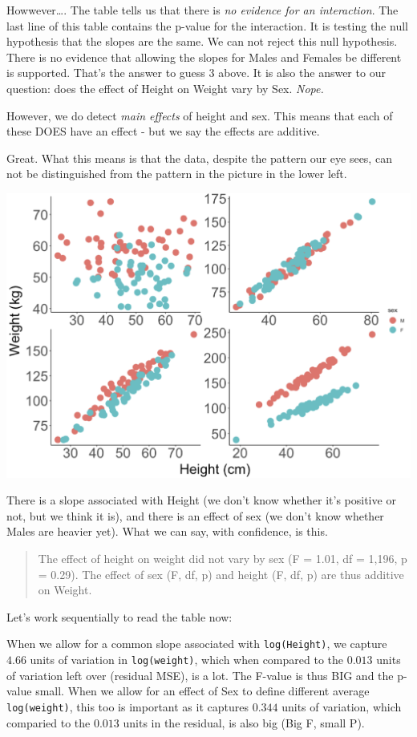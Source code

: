 \documentclass[
]{book}
\begin{document}
Howwever\ldots. The table tells us that there is \emph{no evidence for an interaction}. The last line of this table contains the p-value for the interaction. It is testing the null hypothesis that the slopes are the same. We can not reject this null hypothesis. There is no evidence that allowing the slopes for Males and Females be different is supported. That's the answer to guess 3 above. It is also the answer to our question: does the effect of Height on Weight vary by Sex. \emph{Nope.}

However, we do detect \emph{main effects} of height and sex. This means that each of these DOES have an effect - but we say the effects are additive.

Great. What this means is that the data, despite the pattern our eye sees, can not be distinguished from the pattern in the picture in the lower left.

\includegraphics[width=17.89in]{images/ANCOVA_1}

There is a slope associated with Height (we don't know whether it's positive or not, but we think it is), and there is an effect of sex (we don't know whether Males are heavier yet). What we can say, with confidence, is this.

\begin{quote}
The effect of height on weight did not vary by sex (F = 1.01, df = 1,196, p = 0.29). The effect of sex (F, df, p) and height (F, df, p) are thus additive on Weight.
\end{quote}

Let's work sequentially to read the table now:

When we allow for a common slope associated with \texttt{log(Height)}, we capture \(4.66\) units of variation in \texttt{log(weight)}, which when compared to the \(0.013\) units of variation left over (residual MSE), is a lot. The F-value is thus BIG and the p-value small. When we allow for an effect of Sex to define different average \texttt{log(weight)}, this too is important as it captures \(0.344\) units of variation, which comparied to the \(0.013\) units in the residual, is also big (Big F, small P).
\end{document}
